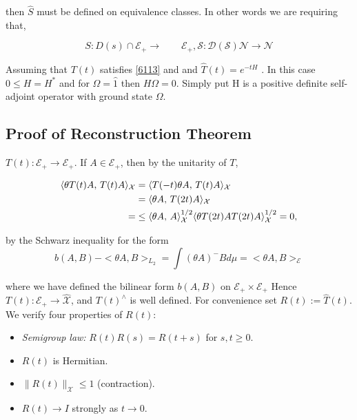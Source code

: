 \documentclass{article}
\newcommand{\1}{\mathbbm{1}}
\theoremstyle{plain}
\theoremstyle{definition}
\numberwithin{equation}{section}
\begin{document}
then $\hat{S}$ must be defined on equivalence classes. In other words we are requiring that, 

\begin{equation}\label{6113}
    S: D(s) \cap  \mathcal{E}_+ \rightarrow \qquad \mathcal{E_{+}, S: D(S) } \mathcal{N} \rightarrow \mathcal{N}
\end{equation}

Assuming that $T(t)$ satisfies \eqref{6113} and and $\hat{T}(t) = e^{-t H}$ . In this case $0 \leq H = H^*$ and for $\Omega= \hat{1}$ then $H \Omega = 0 $. Simply put H is a positive definite self-adjoint operator with ground state $\Omega$. 

\subsection{Proof of Reconstruction Theorem}


 \(T(t)\colon\mathcal{E}_{+}\to\mathcal{E}_{+}\).
If \(A\in\mathcal{E}_{+}\), then by the unitarity of \(T\),

\begin{equation}\label{ 6.1.14}
    \begin{split}
      \langle\theta T(t)A,\,T(t) A\rangle_{\mathcal {X}}
   &=\langle T(-t)\theta A,\,T(t)A\rangle_{\mathcal{ X}}\notag\\
   &=\langle\theta A,\,T(2t)A\rangle_{\mathcal{ X}}\notag\\
  = &\le\langle\theta A,\,A\rangle_{\mathcal{ X}}^{1/2}
        \langle\theta T(2t)AT(2t)A\rangle_{\mathcal{X}}^{1/2}=0,  
    \end{split}
\end{equation}


by the Schwarz inequality for the form
\begin{equation}
    b (A, B) - < \theta A, B >_{L_2}= \int (\theta A)^- B d \mu = < \theta A, B>_\mathcal{E}
\end{equation}

where we have defined the bilinear form $b(A,B)$ on $\mathcal{E}_+ \times \mathcal{E}_+$
Hence \(T(t)\colon\mathcal{E}_{+}\to\widehat{\mathcal{X}}\), and
\(T(t)^{\wedge}\) is well defined.  
For convenience set \(R(t):=\hat{T}(t)\).
We verify four properties of \(R(t)\):

\begin{itemize}
    \item \emph{Semigroup law:} \(R(t)R(s)=R(t+s)\) for \(s,t\ge0\).
\item \(R(t)\) is Hermitian.
\item \(\lVert R(t)\rVert_{\mathcal X}\le1\) (contraction).
\item \(R(t)\to I\) strongly as \(t\to0\). 
\end{itemize}
\end{document}

